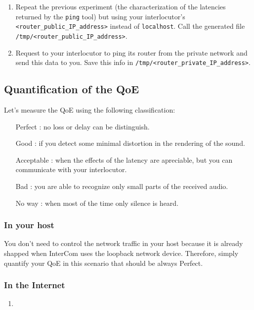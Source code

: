 \begin{enumerate}
\item Repeat the previous experiment (the characterization of the
  latencies returned by the \texttt{ping} tool) but using your
  interlocutor's \texttt{<router\_public\_IP\_address>} instead of
  \texttt{localhost}. Call the generated file
  \texttt{/tmp/<router\_public\_IP\_address>}.
\item Request to your interlocutor to ping its router from the private
  network and send this data to you. Save this info in
  \texttt{/tmp/<router\_private\_IP\_address>}.

\end{enumerate}

\subsection{Quantification of the QoE}

Let's measure the QoE using the following classification:
\begin{itemize}
\item [Perfect]: no loss or delay can be distinguish.
\item [Good]: if you detect some minimal distortion in the rendering
  of the sound.
\item [Acceptable]: when the effects of the latency are apreciable, but
  you can communicate with your interlocutor.
\item [Bad]: you are able to recognize only small parts of the
  received audio.
\item [No way]: when most of the time only silence is heard.
\end{itemize}

\subsubsection{In your host}

You don't need to control the network traffic in your host because it
is already shapped when InterCom uses the loopback network
device. Therefore, simply quantify your QoE in this scenario that
should be always Perfect.

\subsubsection{In the Internet}

\begin{enumerate}
  
\item 

\end{enumerate}

